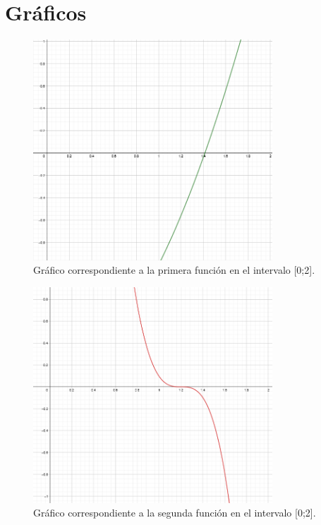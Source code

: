 \documentclass[titlepage,a4paper]{article}
\begin{document}
\section{Gráficos}\label{sec:graficos}

\begin{figure}[H]
\centering
\includegraphics[width=0.8\textwidth]{funcion1.png}
\caption{\label{fig:class01}Gráfico correspondiente a la primera función en el intervalo [0;2].}
\end{figure}

\begin{figure}[H]
\centering
\includegraphics[width=0.8\textwidth]{funcion2.png}
\caption{\label{fig:class01}Gráfico correspondiente a la segunda función en el intervalo [0;2].}
\end{figure}
\end{document}
